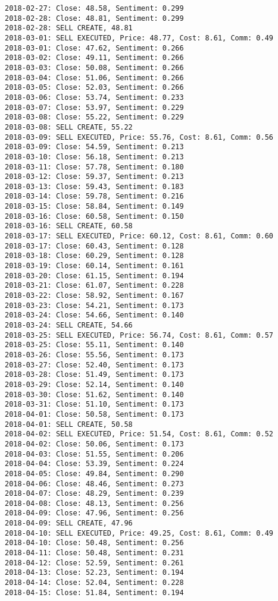 \documentclass[11pt]{article}
\begin{document}
\begin{Verbatim}[commandchars=\\\{\}]
2018-02-27: Close: 48.58, Sentiment: 0.299
2018-02-28: Close: 48.81, Sentiment: 0.299
2018-02-28: SELL CREATE, 48.81
2018-03-01: SELL EXECUTED, Price: 48.77, Cost: 8.61, Comm: 0.49
2018-03-01: Close: 47.62, Sentiment: 0.266
2018-03-02: Close: 49.11, Sentiment: 0.266
2018-03-03: Close: 50.08, Sentiment: 0.266
2018-03-04: Close: 51.06, Sentiment: 0.266
2018-03-05: Close: 52.03, Sentiment: 0.266
2018-03-06: Close: 53.74, Sentiment: 0.233
2018-03-07: Close: 53.97, Sentiment: 0.229
2018-03-08: Close: 55.22, Sentiment: 0.229
2018-03-08: SELL CREATE, 55.22
2018-03-09: SELL EXECUTED, Price: 55.76, Cost: 8.61, Comm: 0.56
2018-03-09: Close: 54.59, Sentiment: 0.213
2018-03-10: Close: 56.18, Sentiment: 0.213
2018-03-11: Close: 57.78, Sentiment: 0.180
2018-03-12: Close: 59.37, Sentiment: 0.213
2018-03-13: Close: 59.43, Sentiment: 0.183
2018-03-14: Close: 59.78, Sentiment: 0.216
2018-03-15: Close: 58.84, Sentiment: 0.149
2018-03-16: Close: 60.58, Sentiment: 0.150
2018-03-16: SELL CREATE, 60.58
2018-03-17: SELL EXECUTED, Price: 60.12, Cost: 8.61, Comm: 0.60
2018-03-17: Close: 60.43, Sentiment: 0.128
2018-03-18: Close: 60.29, Sentiment: 0.128
2018-03-19: Close: 60.14, Sentiment: 0.161
2018-03-20: Close: 61.15, Sentiment: 0.194
2018-03-21: Close: 61.07, Sentiment: 0.228
2018-03-22: Close: 58.92, Sentiment: 0.167
2018-03-23: Close: 54.21, Sentiment: 0.173
2018-03-24: Close: 54.66, Sentiment: 0.140
2018-03-24: SELL CREATE, 54.66
2018-03-25: SELL EXECUTED, Price: 56.74, Cost: 8.61, Comm: 0.57
2018-03-25: Close: 55.11, Sentiment: 0.140
2018-03-26: Close: 55.56, Sentiment: 0.173
2018-03-27: Close: 52.40, Sentiment: 0.173
2018-03-28: Close: 51.49, Sentiment: 0.173
2018-03-29: Close: 52.14, Sentiment: 0.140
2018-03-30: Close: 51.62, Sentiment: 0.140
2018-03-31: Close: 51.10, Sentiment: 0.173
2018-04-01: Close: 50.58, Sentiment: 0.173
2018-04-01: SELL CREATE, 50.58
2018-04-02: SELL EXECUTED, Price: 51.54, Cost: 8.61, Comm: 0.52
2018-04-02: Close: 50.06, Sentiment: 0.173
2018-04-03: Close: 51.55, Sentiment: 0.206
2018-04-04: Close: 53.39, Sentiment: 0.224
2018-04-05: Close: 49.84, Sentiment: 0.290
2018-04-06: Close: 48.46, Sentiment: 0.273
2018-04-07: Close: 48.29, Sentiment: 0.239
2018-04-08: Close: 48.13, Sentiment: 0.256
2018-04-09: Close: 47.96, Sentiment: 0.256
2018-04-09: SELL CREATE, 47.96
2018-04-10: SELL EXECUTED, Price: 49.25, Cost: 8.61, Comm: 0.49
2018-04-10: Close: 50.48, Sentiment: 0.256
2018-04-11: Close: 50.48, Sentiment: 0.231
2018-04-12: Close: 52.59, Sentiment: 0.261
2018-04-13: Close: 52.23, Sentiment: 0.194
2018-04-14: Close: 52.04, Sentiment: 0.228
2018-04-15: Close: 51.84, Sentiment: 0.194

\end{Verbatim}
\end{document}
